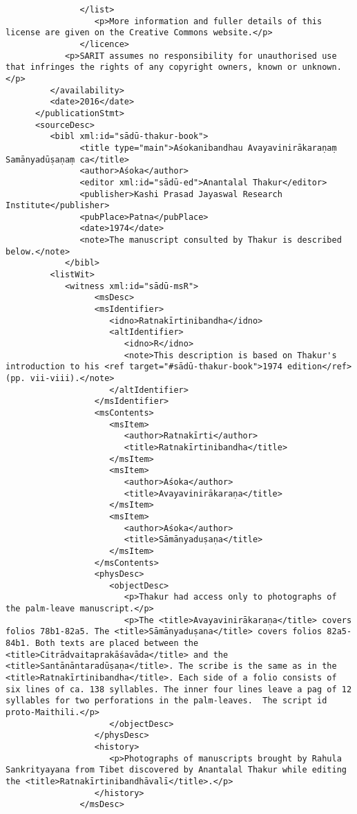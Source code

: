 \documentclass[article,12pt,a4paper]{memoir}%
\begin{document}
\begin{verbatim}
               </list>
	              <p>More information and fuller details of this license are given on the Creative Commons website.</p>
	           </licence>
            <p>SARIT assumes no responsibility for unauthorised use that infringes the rights of any copyright owners, known or unknown.</p>
         </availability>
         <date>2016</date>
      </publicationStmt>
      <sourceDesc>
         <bibl xml:id="sādū-thakur-book">
	           <title type="main">Aśokanibandhau Avayavinirākaraṇaṃ Samānyadūṣaṇaṃ ca</title>
	           <author>Aśoka</author>
	           <editor xml:id="sādū-ed">Anantalal Thakur</editor>
	           <publisher>Kashi Prasad Jayaswal Research Institute</publisher>
	           <pubPlace>Patna</pubPlace>
	           <date>1974</date>
	           <note>The manuscript consulted by Thakur is described below.</note>
	        </bibl>
         <listWit>
            <witness xml:id="sādū-msR">
	              <msDesc>
                  <msIdentifier>
                     <idno>Ratnakīrtinibandha</idno>
                     <altIdentifier>
                        <idno>R</idno>
                        <note>This description is based on Thakur's introduction to his <ref target="#sādū-thakur-book">1974 edition</ref> (pp. vii-viii).</note>
                     </altIdentifier>
                  </msIdentifier>
                  <msContents>
                     <msItem>
                        <author>Ratnakīrti</author>
                        <title>Ratnakīrtinibandha</title>
                     </msItem>
                     <msItem>
                        <author>Aśoka</author>
                        <title>Avayavinirākaraṇa</title>
                     </msItem>
                     <msItem>
                        <author>Aśoka</author>
                        <title>Sāmānyaduṣaṇa</title>
                     </msItem>
                  </msContents>
                  <physDesc>
                     <objectDesc>
                        <p>Thakur had access only to photographs of the palm-leave manuscript.</p>
                        <p>The <title>Avayavinirākaraṇa</title> covers folios 78b1-82a5. The <title>Sāmānyaduṣana</title> covers folios 82a5-84b1. Both texts are placed between the <title>Citrādvaitaprakāśavāda</title> and the <title>Santānāntaradūṣaṇa</title>. The scribe is the same as in the <title>Ratnakīrtinibandha</title>. Each side of a folio consists of six lines of ca. 138 syllables. The inner four lines leave a pag of 12 syllables for two perforations in the palm-leaves.  The script id proto-Maithili.</p>
                     </objectDesc>
                  </physDesc>
                  <history>
                     <p>Photographs of manuscripts brought by Rahula Sankrityayana from Tibet discovered by Anantalal Thakur while editing the <title>Ratnakīrtinibandhāvalī</title>.</p>
                  </history>
               </msDesc>


\end{verbatim}
\end{document}
